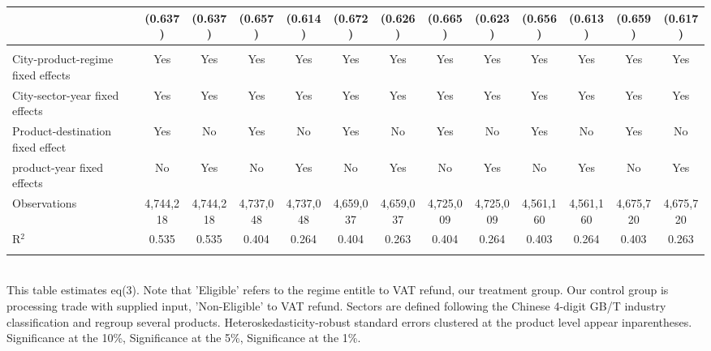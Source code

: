 \documentclass[preview]{standalone}
\begin{document}
\begin{table}[!htbp]
\begin{adjustbox}{width=\textwidth, totalheight=\baselineskip,keepaspectratio}
\begin{tabular}{@{\extracolsep{5pt}}lcccccccccccc}
  & (0.637) & (0.637) & (0.657) & (0.614) & (0.672) & (0.626) & (0.665) & (0.623) & (0.656) & (0.613) & (0.659) & (0.617) \\ 
 \hline \\[-1.8ex] 
City-product-regime fixed effects & Yes & Yes & Yes & Yes & Yes & Yes & Yes & Yes & Yes & Yes & Yes & Yes \\ 
City-sector-year fixed effects & Yes & Yes & Yes & Yes & Yes & Yes & Yes & Yes & Yes & Yes & Yes & Yes \\ 
Product-destination fixed effect & Yes & No & Yes & No & Yes & No & Yes & No & Yes & No & Yes & No \\ 
product-year fixed effects & No & Yes & No & Yes & No & Yes & No & Yes & No & Yes & No & Yes \\ 
Observations & 4,744,218 & 4,744,218 & 4,737,048 & 4,737,048 & 4,659,037 & 4,659,037 & 4,725,009 & 4,725,009 & 4,561,160 & 4,561,160 & 4,675,720 & 4,675,720 \\ 
R$^{2}$ & 0.535 & 0.535 & 0.404 & 0.264 & 0.404 & 0.263 & 0.404 & 0.264 & 0.403 & 0.264 & 0.403 & 0.263 \\ 
\hline 
\hline \\[-1.8ex] 
\end{tabular}
\end{adjustbox}
\begin{tablenotes} 
 \small 
 \item \\ 

This table estimates eq(3). 
Note that 'Eligible' refers to the regime entitle to VAT refund, our treatment group.
Our control group is processing trade with supplied input, 'Non-Eligible' to VAT refund.
Sectors are defined following the Chinese 4-digit GB/T industry
classification and regroup several products.
Heteroskedasticity-robust standard errors
clustered at the product level appear inparentheses.
\sym{*} Significance at the 10\%, \sym{**} Significance at the 5\%, \sym{***} Significance at the 1\%. 
\end{tablenotes}
\end{table}
\end{document}
